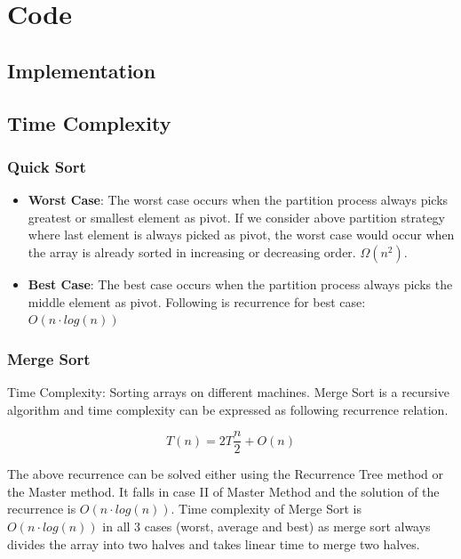 \documentclass[a4paper, 12pt]{article}
\begin{document}
\section{Code}

\subsection{Implementation}



\subsection{Time Complexity}

\subsubsection*{Quick Sort}
\begin{itemize}
  \item \textbf{Worst Case}: The worst case occurs when the partition process always picks greatest or smallest element as pivot. If we consider above partition strategy where last element is always picked as pivot, the worst case would occur when the array is already sorted in increasing or decreasing order. \textbf{\textit{$\Omega(n^2)$}}. 
  \item \textbf{Best Case}: The best case occurs when the partition process always picks the middle element as pivot. Following is recurrence for best case: $O(n\cdot log(n))$
\end{itemize}

\subsubsection*{Merge Sort}

Time Complexity: Sorting arrays on different machines. Merge Sort is a recursive algorithm and time complexity can be expressed as following recurrence relation. 

$$
  T(n) = 2T\frac{n}{2} + O(n)
$$

The above recurrence can be solved either using the Recurrence Tree method or the Master method. It falls in case II of Master Method and the solution of the recurrence is $O(n\cdot log(n))$. Time complexity of Merge Sort is  $O(n\cdot log(n))$ in all 3 cases (worst, average and best) as merge sort always divides the array into two halves and takes linear time to merge two halves.
\end{document}
